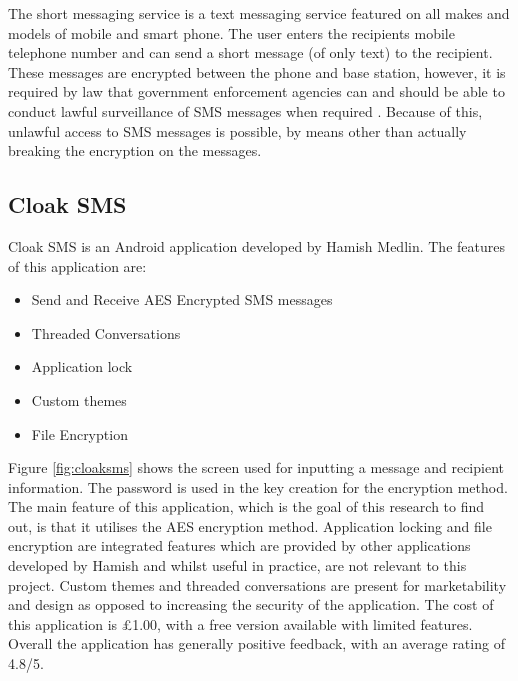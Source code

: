 \documentclass[a4paper,12pt]{report}
\begin{document}
The short messaging service is a text messaging service featured on all makes and models of mobile and smart phone. The user enters the recipients mobile telephone number and can send a short message (of only text) to the recipient. These messages are encrypted between the phone and base station, however, it is required by law that government enforcement agencies can and should be able to conduct lawful surveillance of SMS messages when required \cite{aresmssafe}. Because of this, unlawful access to SMS messages is possible, by means other than actually breaking the encryption on the messages.

\subsection{Cloak SMS}

Cloak SMS \cite{cloaksms} is an Android application developed by Hamish Medlin. The features of this application are: 

\begin{itemize}
 \item Send and Receive AES Encrypted SMS messages
 \item Threaded Conversations
 \item Application lock
 \item Custom themes
 \item File Encryption
\end{itemize}

Figure \ref{fig:cloaksms} shows the screen used for inputting a message and recipient information. The password is used in the key creation for the encryption method. The main feature of this application, which is the goal of this research to find out, is that it utilises the AES encryption method. Application locking and file encryption are integrated features which are provided by other applications developed by Hamish and whilst useful in practice, are not relevant to this project. Custom themes and threaded conversations are present for marketability and design as opposed to increasing the security of the application. The cost of this application is £1.00, with a free version available with limited features. Overall the application has generally positive feedback, with an average rating of 4.8/5.
\end{document}
